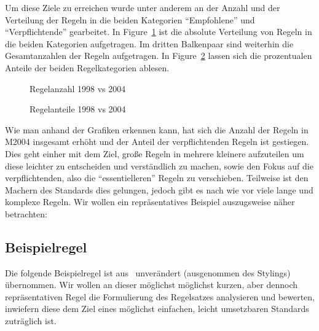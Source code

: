 \documentclass[a4paper,UKenglish,cleveref, autoref]{templates/lipics-v2019}
\begin{document}
    Um diese Ziele zu erreichen wurde unter anderem an der Anzahl und der Verteilung der Regeln in die beiden Kategorien
    \enquote{Empfohlene} und \enquote{Verpflichtende} gearbeitet.
    In Figure~\ref{fig:bar-1998-2004} ist die absolute Verteilung von Regeln in die beiden Kategorien aufgetragen.
    Im dritten Balkenpaar sind weiterhin die Gesamtanzahlen der Regeln aufgetragen.
    In Figure~\ref{fig:pie-1998-2004} lassen sich die prozentualen Anteile der beiden Regelkategorien ablesen.

    \begin{figure}[H]
        \centering
        \captionsetup{justification=centering,margin=2cm}
        
        \caption{Regelanzahl 1998 vs 2004}
        \label{fig:bar-1998-2004}
    \end{figure}

    \begin{figure}[H]
        \centering
        \captionsetup{justification=centering,margin=2cm}
        
        \caption{Regelanteile 1998 vs 2004}
        \label{fig:pie-1998-2004}
    \end{figure}

    Wie man anhand der Grafiken erkennen kann, hat sich die Anzahl der Regeln in M2004 insgesamt erhöht und der Anteil
    der verpflichtenden Regeln ist gestiegen.
    Dies geht einher mit dem Ziel, große Regeln in mehrere kleinere aufzuteilen um diese leichter zu entscheiden
    und verständlich zu machen, sowie den Fokus auf die verpflichtenden, also die \enquote{essentielleren} Regeln zu verschieben.
    Teilweise ist den Machern des Standards dies gelungen, jedoch gibt es nach wie vor viele lange und komplexe Regeln.
    Wir wollen ein repräsentatives Beispiel auszugsweise näher betrachten:

    \subsection{Beispielregel}
    \label{subsec:beispielregel}

    Die folgende Beispielregel ist aus \misra\ unverändert (ausgenommen des Stylings) übernommen.
    Wir wollen an dieser möglichst möglichst kurzen, aber dennoch repräsentativen Regel die Formulierung des Regelsatzes
    analysieren und bewerten, inwiefern diese dem Ziel eines möglichst einfachen, leicht umsetzbaren Standards zuträglich ist.\\
\end{document}
